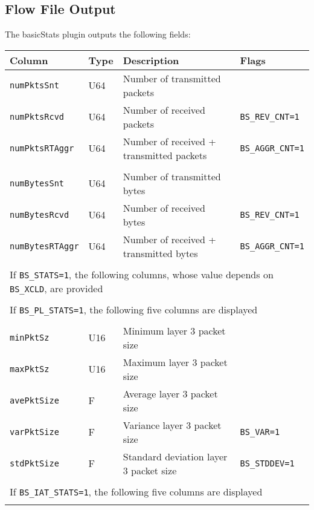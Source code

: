 \documentclass[documentation]{subfiles}
\begin{document}
\subsection{Flow File Output}
The basicStats plugin outputs the following fields:
\begin{longtable}{llll}
    \toprule
    {\bf Column} & {\bf Type} & {\bf Description} & {\bf Flags}\\
    \midrule\endhead%
    {\tt numPktsSnt}     & U64 & Number of transmitted packets            & \\
    {\tt numPktsRcvd}    & U64 & Number of received packets               & {\tt BS\_REV\_CNT=1}\\
    {\tt numPktsRTAggr}  & U64 & Number of received + transmitted packets & {\tt BS\_AGGR\_CNT=1}\\\\

    {\tt numBytesSnt}    & U64 & Number of transmitted bytes            & \\
    {\tt numBytesRcvd}   & U64 & Number of received bytes               & {\tt BS\_REV\_CNT=1}\\
    {\tt numBytesRTAggr} & U64 & Number of received + transmitted bytes & {\tt BS\_AGGR\_CNT=1}\\\\

    \multicolumn{4}{l}{If {\tt BS\_STATS=1}, the following columns, whose value depends on {\tt BS\_XCLD}, are provided}\\\\

    \multicolumn{4}{l}{If {\tt BS\_PL\_STATS=1}, the following five columns are displayed}\\\\

    {\tt minPktSz}   & U16 & Minimum layer 3 packet size\\
    {\tt maxPktSz}   & U16 & Maximum layer 3 packet size\\
    {\tt avePktSize} &   F & Average layer 3 packet size\\
    {\tt varPktSize} &   F & Variance layer 3 packet size           & {\tt BS\_VAR=1}\\
    {\tt stdPktSize} &   F & Standard deviation layer 3 packet size & {\tt BS\_STDDEV=1}\\\\

    \multicolumn{4}{l}{If {\tt BS\_IAT\_STATS=1}, the following five columns are displayed}\\\\


\end{longtable}
\end{document}
